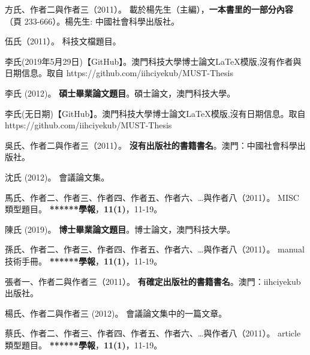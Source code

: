 
    \begin{thebibliography}{}


方氏、作者二與作者三（2011）。
\newblock  載於楊先生（主編），\textbf{一本書里的一部分內容}（頁 233-666）。楊先生: 中國社會科學出版社。

伍氏（2011）。
\newblock 科技文檔題目。

李氏(2019年5月29日)【GitHub】。澳門科技大學博士論文\LaTeX 模版,沒有作者與日期信息。取自 https://github.com/iihciyekub/MUST-Thesis

李氏 (2012)。
\newblock \textbf{碩士畢業論文題目}。碩士論文，澳門科技大學。

李氏(无日期)【GitHub】。澳門科技大學博士論文\LaTeX 模版,沒有日期信息。取自 https://github.com/iihciyekub/MUST-Thesis

吳氏、作者二與作者三（2011）。
\newblock \textbf{ 沒有出版社的書籍書名}。澳門：中國社會科學出版社。

沈氏 (2012)。
\newblock 會議論文集。

馬氏、作者二、作者三、作者四、作者五、作者六、…與作者八（2011）。
\newblock MISC 類型題目。
\newblock \textbf{******學報}，\textbf{11}\textbf{(1)}，11-19。

陳氏 (2019)。
\newblock \textbf{博士畢業論文題目}。博士論文，澳門科技大學。

孫氏、作者二、作者三、作者四、作者五、作者六、…與作者八（2011）。
\newblock manual 技術手冊。
\newblock \textbf{******學報}，\textbf{11}\textbf{(1)}，11-19。

張者一、作者二與作者三（2011）。
\newblock \textbf{ 有確定出版社的書籍書名}。澳門：iihciyekub出版社。

楊氏、作者二與作者三 (2012)。
\newblock 會議論文集中的一篇文章。

蔡氏、作者二、作者三、作者四、作者五、作者六、…與作者八（2011）。
\newblock article 類型題目。
\newblock \textbf{******學報}，\textbf{11}\textbf{(1)}，11-19。


\end{thebibliography}
